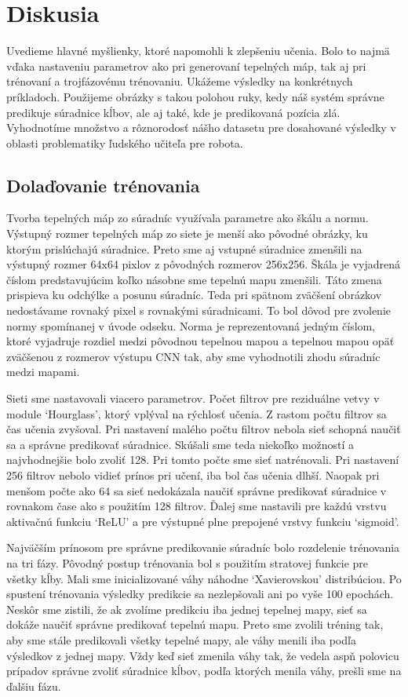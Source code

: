 \chapter{Diskusia}\label{chap:discussion}
Uvedieme hlavné myšlienky, ktoré napomohli k zlepšeniu učenia. Bolo to najmä vďaka nastaveniu parametrov ako pri generovaní tepelných máp, tak aj pri trénovaní a trojfázovému trénovaniu. Ukážeme výsledky na konkrétnych príkladoch. Použijeme obrázky s takou polohou ruky, kedy náš systém správne predikuje súradnice kĺbov, ale aj také, kde je predikovaná pozícia zlá. Vyhodnotíme množstvo a rôznorodosť nášho datasetu pre dosahované výsledky v oblasti problematiky ľudského učiteľa pre robota.

\section{Dolaďovanie trénovania}
Tvorba tepelných máp zo súradníc využívala parametre ako škálu a normu. Výstupný rozmer tepelných máp zo siete je menší ako pôvodné obrázky, ku ktorým prislúchajú súradnice. Preto sme aj vstupné súradnice zmenšili na výstupný rozmer 64x64 pixlov z pôvodných rozmerov 256x256. Škála je vyjadrená číslom predstavujúcim koľko násobne sme tepelnú mapu zmenšili. Táto zmena prispieva ku odchýlke a posunu súradníc. Teda pri spätnom zväčšení obrázkov nedostávame rovnaký pixel s rovnakými súradnicami. To bol dôvod pre zvolenie normy spomínanej v úvode odseku. Norma je reprezentovaná jedným číslom, ktoré vyjadruje rozdiel medzi pôvodnou tepelnou mapou a tepelnou mapou opäť zväčšenou z rozmerov výstupu CNN tak, aby sme vyhodnotili zhodu súradníc medzi mapami.

Sieti sme nastavovali viacero parametrov. Počet filtrov pre reziduálne vetvy v module `Hourglass', ktorý vplýval na rýchlosť učenia. Z rastom počtu filtrov sa čas učenia zvyšoval. Pri nastavení malého počtu filtrov nebola sieť schopná naučiť sa a správne predikovať súradnice. Skúšali sme teda niekoľko možností a najvhodnejšie bolo zvoliť 128. Pri tomto počte sme sieť natrénovali. Pri nastavení 256 filtrov nebolo vidieť prínos pri učení, iba bol čas učenia dlhší. Naopak pri menšom počte ako 64 sa sieť nedokázala naučiť správne predikovať súradnice v rovnakom čase ako s použitím 128 filtrov. Ďalej sme nastavili pre každú vrstvu aktivačnú funkciu `ReLU' a pre výstupné plne prepojené vrstvy funkciu `sigmoid'.

Najväčším prínosom pre správne predikovanie súradníc bolo rozdelenie trénovania na tri fázy. Pôvodný postup trénovania bol s použitím stratovej funkcie pre všetky kĺby. Mali sme inicializované váhy náhodne `Xavierovskou' distribúciou. Po spustení trénovania výsledky predikcie sa nezlepšovali ani po vyše 100 epochách. Neskôr sme zistili, že ak zvolíme predikciu iba jednej tepelnej mapy, sieť sa dokáže naučiť správne predikovať tepelnú mapu. Preto sme zvolili tréning tak, aby sme stále predikovali všetky tepelné mapy, ale váhy menili iba podľa výsledkov z jednej mapy. Vždy keď sieť zmenila váhy tak, že vedela aspň polovicu prípadov správne zvoliť súradnice kĺbov, podľa ktorých menila váhy, prešli sme na ďalšiu fázu. 

